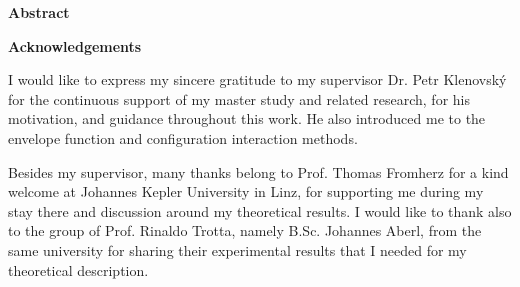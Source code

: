 \documentclass[
a4paper, %
11pt, %
onecolumn, %
openany, %
oldfontcommands,
]{memoir}
\begin{document}
\vspace{3cm}
\vfill


\noindent\Large\textbf{Abstract}\\ \normalsize



%
\newpage


\noindent\Large\textbf{Acknowledgements}\\ \normalsize

\noindent I would like to express my sincere gratitude to my supervisor Dr. Petr Klenovský for the continuous support of my master study and related research, for his motivation, and guidance throughout this work. He also introduced me to the envelope function and configuration interaction methods. 

Besides my supervisor, many thanks belong to Prof. Thomas Fromherz for a kind welcome at Johannes Kepler University in Linz, for supporting me during my stay there and discussion around my theoretical results. I would like to thank also to the group of Prof. Rinaldo Trotta, namely B.Sc. Johannes Aberl, from the same university for sharing their experimental results that I needed for my theoretical description.
\end{document}
